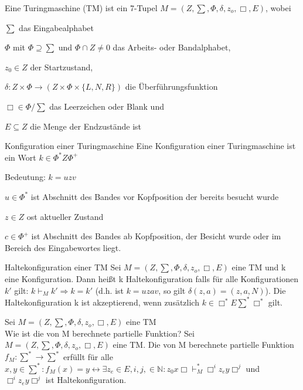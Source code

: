 \documentclass[avery5371, frame]{flashcards}
\begin{document}
\begin{flashcard}[Definition]{ Eine Turingmaschine (TM)}
    ist ein 7-Tupel $M=(Z,\sum, \Phi, \delta, z_o, \Box, E)$, wobei
    \begin{itemize*}
        \item $\sum$ das Eingabealphabet
        \item $\Phi$ mit $\Phi\supseteq\sum$ und $\Phi\cap Z\not= 0$ das Arbeits- oder Bandalphabet,
        \item $z_0\in Z$ der Startzustand,
        \item $\delta:Z\times\Phi\rightarrow(Z\times\Phi\times\{L,N,R\})$ die Überführungsfunktion
        \item $\Box\in\Phi/\sum$ das Leerzeichen oder Blank und
        \item $E\subseteq Z$ die Menge der Endzustände ist
    \end{itemize*}
\end{flashcard}

\begin{flashcard}[Definition]{Konfiguration einer Turingmaschine}
    Eine Konfiguration einer Turingmaschine ist ein Wort $k\in\Phi^*Z\Phi^+$

    Bedeutung: $k=uzv$
    \begin{itemize*}
        \item $u\in\Phi^*$ ist Abschnitt des Bandes vor Kopfposition der bereits besucht wurde
        \item $z\in Z$ ost aktueller Zustand
        \item $c\in\Phi^+$ ist Abschnitt des Bandes ab Kopfposition, der Besicht wurde oder im Bereich des Eingabewortes liegt.
    \end{itemize*}
\end{flashcard}

\begin{flashcard}[Definition]{Haltekonfiguration einer TM}
    Sei $M=(Z,\sum,\Phi,\delta,z_o,\Box,E)$ eine TM und k eine Konfiguration. Dann heißt k Haltekonfiguration falls für alle Konfigurationen $k'$ gilt: $k\vdash_M k'\Rightarrow k=k'$ (d.h. ist $k=uzav$, so gilt $\delta(z,a)=(z,a,N)$).
    Die Haltekonfiguration k ist akzeptierend, wenn zusätzlich $k\in\Box^*E\sum^*\Box^*$ gilt.
\end{flashcard}

\begin{flashcard}[Definition]{Sei $M=(Z,\sum,\Phi,\delta,z_o,\Box,E)$ eine TM\\ Wie ist die von M berechnete partielle Funktion?}
    Sei $M=(Z,\sum,\Phi,\delta,z_o,\Box,E)$ eine TM. Die von M berechnete partielle Funktion $f_M:\sum^*\rightarrow \sum^*$ erfüllt für alle $x,y\in\sum^*: f_M(x)=y\leftrightarrow \exists z_e \in E,i,j,\in\mathbb{N}:z_0x\Box \vdash_M^* \Box^i z_e y\Box^j$ und $\Box^iz_ey\Box^j$ ist Haltekonfiguration.
\end{flashcard}
\end{document}
